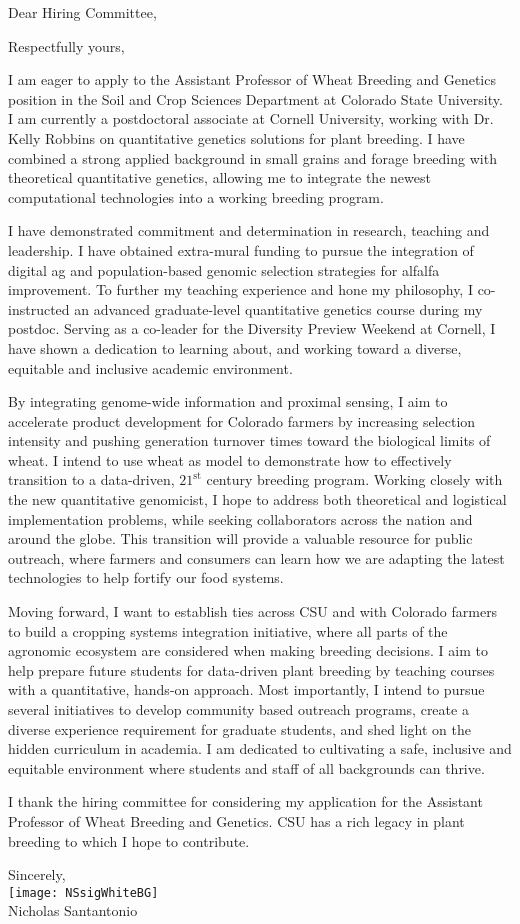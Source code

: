 \documentclass[11pt, letterpaper]{moderncv}
\begin{document}
\date{\today}
\opening{Dear Hiring Committee,}
\closing{Respectfully yours,}
\makelettertitle

I am eager to apply to the Assistant Professor of Wheat Breeding and Genetics position in the Soil and Crop Sciences Department at Colorado State University. I am currently a postdoctoral associate at Cornell University, working with Dr. Kelly Robbins on quantitative genetics solutions for plant breeding. I have combined a strong applied background in small grains and forage breeding with theoretical quantitative genetics, allowing me to integrate the newest computational technologies into a working breeding program.

I have demonstrated commitment and determination in research, teaching and leadership. I have obtained extra-mural funding to pursue the integration of digital ag and population-based genomic selection strategies for alfalfa improvement. To further my teaching experience and hone my philosophy, I co-instructed an advanced graduate-level quantitative genetics course during my postdoc. Serving as a co-leader for the Diversity Preview Weekend at Cornell, I have shown a dedication to learning about, and working toward a diverse, equitable and inclusive academic environment. 

By integrating genome-wide information and proximal sensing, I aim to accelerate product development for Colorado farmers by increasing selection intensity and pushing generation turnover times toward the biological limits of wheat. I intend to use wheat as model to demonstrate how to effectively transition to a data-driven, $21^\text{st}$ century breeding program. Working closely with the new quantitative genomicist, I hope to address both theoretical and logistical implementation problems, while seeking collaborators across the nation and around the globe. This transition will provide a valuable resource for public outreach, where farmers and consumers can learn how we are adapting the latest technologies to help fortify our food systems.

Moving forward, I want to establish ties across CSU and with Colorado farmers to build a cropping systems integration initiative, where all parts of the agronomic ecosystem are considered when making breeding decisions. I aim to help prepare future students for data-driven plant breeding by teaching courses with a quantitative, hands-on approach. Most importantly, I intend to pursue several initiatives to develop community based outreach programs, create a diverse experience requirement for graduate students, and shed light on the hidden curriculum in academia. I am dedicated to cultivating a safe, inclusive and equitable environment where students and staff of all backgrounds can thrive. 

I thank the hiring committee for considering my application for the Assistant Professor of Wheat Breeding and Genetics. CSU has a rich legacy in plant breeding to which I hope to contribute. 

\vspace{3mm}

Sincerely,\\
\texttt{[image: NSsigWhiteBG]}\\
Nicholas Santantonio
\end{document}
